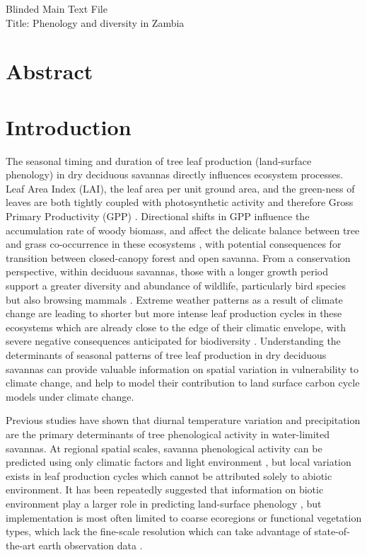 \documentclass[11pt,a4paper]{article}
\newcommand{\titletext}{Phenology and diversity in Zambia}
\begin{document}
{\Large{Blinded Main Text File}}\\
{\Large{Title: \titletext{}}}

\section*{Abstract}

\section{Introduction}

The seasonal timing and duration of tree leaf production (land-surface
phenology) in dry deciduous
savannas directly influences ecosystem processes. Leaf Area Index (LAI), the leaf
area per unit ground area, and the green-ness of leaves are both tightly
coupled with photosynthetic activity and therefore Gross Primary Productivity
(GPP) \citep{Gu2003, Penuelas2009}. Directional shifts in GPP influence the
accumulation rate of woody biomass, and affect the delicate balance between
tree and grass co-occurrence in these ecosystems \citep{Stevens2016}, with
potential consequences for transition between closed-canopy forest and open
savanna. From a conservation perspective, within deciduous savannas, those with
a longer growth period support a greater diversity and abundance of wildlife,
particularly bird species but also browsing mammals \citep{Cole2015, Araujo2017,
Morellato2016, Ogutu2013}. Extreme weather patterns as a result of climate
change are leading to shorter but more intense leaf production cycles in these
ecosystems which are already close to the edge of their climatic envelope, with severe negative consequences anticipated for biodiversity \citep{Bale2002}. Understanding the determinants of seasonal patterns of tree leaf production in dry deciduous savannas can provide valuable information on spatial variation in vulnerability to climate change, and help to model their contribution to land surface carbon cycle models under climate change.

Previous studies have shown that diurnal temperature variation and precipitation are the primary determinants of tree phenological activity in water-limited savannas. At regional spatial scales, savanna phenological activity can be predicted using only climatic factors and light environment \citep{Adole2018a}, but local variation exists in leaf production cycles which cannot be attributed solely to abiotic environment. It has been repeatedly suggested that information on biotic environment play a larger role in predicting land-surface phenology \citep{Adole2018b, Jeganathan2014, Fuller1999}, but implementation is most often limited to coarse ecoregions or functional vegetation types, which lack the fine-scale resolution which can take advantage of state-of-the-art earth observation data \citep{}.
\end{document}
